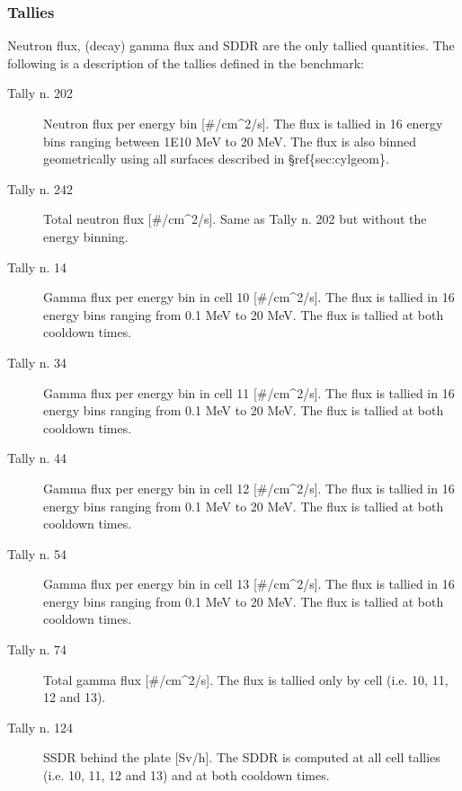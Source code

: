 \documentclass[letterpaper,10pt,english]{sphinxmanual}
\begin{document}
\subsubsection{Tallies}
\label{\detokenize{usage/benchmarks:id11}}
Neutron flux, (decay) gamma flux and SDDR are the only tallied quantities. The following
is a description of the tallies defined in the benchmark:
\begin{description}
\item[{Tally n. 202}] \leavevmode
Neutron flux per energy bin {[}\#/cm\textasciicircum{}2/s{]}. The flux is tallied in 16 energy bins ranging between 1E\sphinxhyphen{}10 MeV to 20 MeV. The flux is also binned geometrically using all surfaces described in \S{}ref\{sec:cylgeom\}.

\item[{Tally n. 242}] \leavevmode
Total neutron flux {[}\#/cm\textasciicircum{}2/s{]}. Same as Tally n. 202 but without the energy binning.

\item[{Tally n. 14}] \leavevmode
Gamma flux per energy bin in cell 10 {[}\#/cm\textasciicircum{}2/s{]}. The flux is tallied in 16 energy bins ranging from 0.1 MeV to 20 MeV. The flux is tallied at both cool\sphinxhyphen{}down times.

\item[{Tally n. 34}] \leavevmode
Gamma flux per energy bin in cell 11 {[}\#/cm\textasciicircum{}2/s{]}. The flux is tallied in 16 energy bins ranging from 0.1 MeV to 20 MeV. The flux is tallied at both cool\sphinxhyphen{}down times.

\item[{Tally n. 44}] \leavevmode
Gamma flux per energy bin in cell 12 {[}\#/cm\textasciicircum{}2/s{]}. The flux is tallied in 16 energy bins ranging from 0.1 MeV to 20 MeV. The flux is tallied at both cool\sphinxhyphen{}down times.

\item[{Tally n. 54}] \leavevmode
Gamma flux per energy bin in cell 13 {[}\#/cm\textasciicircum{}2/s{]}. The flux is tallied in 16 energy bins ranging from 0.1 MeV to 20 MeV. The flux is tallied at both cool\sphinxhyphen{}down times.

\item[{Tally n. 74}] \leavevmode
Total gamma flux {[}\#/cm\textasciicircum{}2/s{]}. The flux is tallied only by cell (i.e. 10, 11, 12 and 13).

\item[{Tally n. 124}] \leavevmode
SSDR behind the plate {[}Sv/h{]}. The SDDR is computed at all cell tallies (i.e. 10, 11, 12 and 13) and at both cool\sphinxhyphen{}down times.

\end{description}
\end{document}
